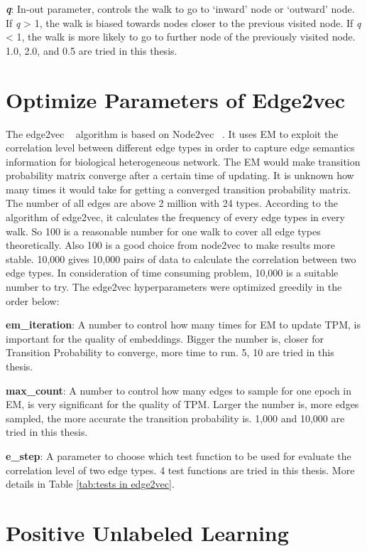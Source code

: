 \textbf{\emph{q}}: In-out parameter, controls the walk to go to ‘inward’ node or ‘outward’ node. If \textit{q} > 1, the walk is biased towards nodes closer to the previous visited node. If \textit{q} < 1, the walk is more likely to go to further node of the previously visited node. 1.0, 2.0, and 0.5 are tried in this thesis.

\section{Optimize Parameters of Edge2vec}\label{op_edge2vec}

The edge2vec ~\cite{gao_edge2vec:_2018} algorithm is based on Node2vec ~\cite{grover_node2vec:_2016}. It uses EM to exploit the correlation level between different edge types in order to capture edge semantics information for biological heterogeneous network. The EM would make transition probability matrix converge after a certain time of updating. It is unknown how many times it would take for getting a converged transition probability matrix. The number of all edges are above 2 million with 24 types. According to the algorithm of edge2vec, it calculates the frequency of every edge types in every walk. So 100 is a reasonable number for one walk to cover all edge types theoretically. Also 100 is a good choice from node2vec to make results more stable. 10,000 gives 10,000 pairs of data to calculate the correlation between two edge types. In consideration of time consuming problem, 10,000 is a suitable number to try. The edge2vec hyperparameters were optimized greedily in the order below:

\textbf{em\_iteration}: A number to control how many times for \ac{EM} to update \ac{TPM}, is important for the quality of embeddings. Bigger the number is, closer for Transition Probability to converge, more time to run. 5, 10 are tried in this thesis.

\textbf{max\_count}: A number to control how many edges to sample for one epoch in EM, is very significant for the quality of \ac{TPM}. Larger the number is, more edges sampled, the more accurate the transition probability is. 1,000 and 10,000 are tried in this thesis.

\textbf{e\_step}: A parameter to choose which test function to be used for evaluate the correlation level of two edge types. 4 test functions are tried in this thesis. More details in Table \ref{tab:tests in edge2vec}.

\section{Positive Unlabeled Learning}

